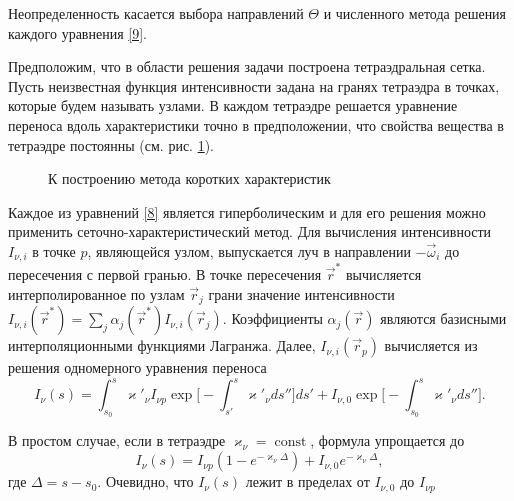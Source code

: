 Неопределенность касается выбора направлений $\Theta$ и численного метода решения каждого уравнения \eqref{9}.

Предположим, что в области решения задачи построена тетраэдральная сетка.
Пусть неизвестная функция интенсивности задана на гранях тетраэдра в точках, которые будем называть узлами. В каждом тетраэдре решается уравнение переноса вдоль характеристики точно в предположении, что свойства вещества в тетраэдре постоянны (см. рис. \ref{fig:3}). 

\begin{figure}[ht!]
\caption{К построению метода коротких характеристик}
\label{fig:3}
\end{figure}

Каждое из уравнений \eqref{8} является гиперболическим и для его решения можно применить сеточно-характеристический метод. Для вычисления интенсивности $I_{\nu,i}$ в точке $p$, являющейся узлом, выпускается луч в направлении $-\vec\omega_i$ до пересечения с первой гранью. В точке пересечения $\vec r^*$ вычисляется интерполированное по узлам $\vec r_j$ грани значение интенсивности $I_{\nu, i} (\vec r^*) = \sum_{j} \alpha_j(\vec r^*) I_{\nu, i}(\vec r_j)$. Коэффициенты $\alpha_j(\vec r)$ являются базисными интерполяционными функциями Лагранжа. Далее, $I_{\nu, i} (\vec r_p)$ вычисляется из решения одномерного уравнения переноса   
\begin {equation}
I_{\nu}(s) = \int_{s_0}^s\varkappa'_{\nu}I_{\nu p} \exp\Big[-\int_{s'}^s\varkappa'_{\nu}ds''\Big]ds' + I_{\nu,0} \exp\Big[-\int_{s_0}^s \varkappa'_{\nu}ds''\Big].
\end {equation}

В простом случае, если в тетраэдре $\varkappa_\nu = \operatorname{const}$, формула упрощается до 
\begin {equation}
I_\nu (s) = I_{\nu p} \left(1 - e^{-\varkappa_\nu \Delta}\right) + I_{\nu,0}e^{-\varkappa_\nu \Delta},
\end {equation}
где $\Delta = s - s_0$. Очевидно, что $I_\nu(s)$ лежит в пределах от $I_{\nu, 0}$ до $I_{\nu p}$
